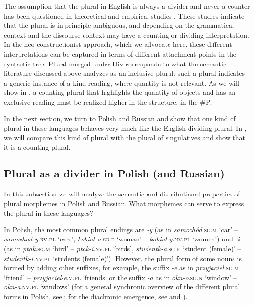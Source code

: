\documentclass[output=paper,colorlinks,citecolor=brown]{langscibook}
\begin{document}
The assumption that the plural in English is always a divider and never a counter has been questioned in theoretical and empirical studies \citep{Alexiadou2019,Grimm2013}. These studies indicate that the plural is in principle ambiguous, and depending on the grammatical context and the discourse context may have a counting or dividing interpretation. In the neo-constructionist approach, which we advocate here, these different interpretations can be captured in terms of different attachment points in the syntactic tree. Plural merged under Div corresponds to what the semantic literature discussed above analyzes as an inclusive plural: such a plural indicates a generic instance-of-a-kind reading, where quantity is not relevant. As we will show in , a counting plural that highlights the quantity of objects and has an exclusive reading must be realized higher in the structure, in the \#P.

In the next section, we turn to Polish and Russian and show that one kind of plural in these languages behaves very much like the English dividing plural. In , we will compare this kind of plural with the plural of singulatives and show that it is a counting plural.


\subsection{Plural as a divider in Polish (and Russian)}\label{sec:geist:2.2}

In this subsection we will analyze the semantic and distributional properties of plural morphemes in Polish and Russian. What morphemes can serve to express the plural in these languages? 

In Polish, the most common plural endings are \textit{-y} (as in \textit{samochód}.\textsc{sg.m} `car' -- \textit{samochod-y}.\textsc{nv.pl} `cars', \textit{kobiet-a}.\textsc{sg.f} `woman' -- \textit{kobiet-y}.\textsc{nv.pl} `women') and \textit{-i} (as in \textit{ptak}.\textsc{sg.m} `bird' -- \textit{ptak-i}.\textsc{nv.pl} `birds', \textit{studentk-a}.\textsc{sg.f} `student (female)' -- \textit{studentk-i}.\textsc{nv.pl} `students (female)'). However, the plural form of some nouns is formed by adding other suffixes, for example, the suffix \textit{-e} as in \textit{przyjaciel}.\textsc{sg.m} `friend' -- \textit{przyjaciel-e}.\textsc{v.pl} `friends' or the suffix \textit{-a} as in \textit{okn-o}.\textsc{sg.n} `window' -- \textit{okn-a}.\textsc{nv.pl} `windows' (for a general synchronic overview of the different plural forms in Polish, see \citealt{Swan2002}; for the diachronic emergence, see \citealt{KlemensiewiczStanislaw1955} and \citealt{Rospond1979}).
\end{document}
